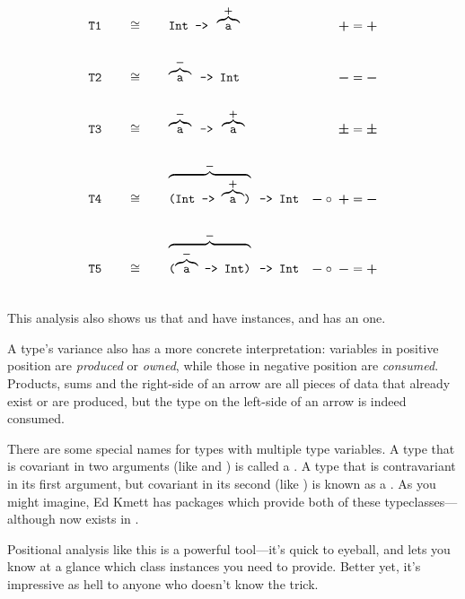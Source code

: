 \documentclass[book.tex]{subfiles}
\begin{document}
\begin{align*}
  \tyAnno{T1}{\ty{Int -> }\posp{\ty{a}}}{\possym}{\possym}
  \tyAnno{T2}{\negp{\ty{a}}\ty{ -> Int}}{\negsym}{\negsym}
  \tyAnno{T3}{\negp{\ty{a}}\ty{ -> }\posp{\ty{a}}}{\pmsym}{\pmsym}
  \tyAnno{T4}{\negp{\ty{(Int -> }\posp{\ty{a}}\ty{)}}\ty{ -> Int}}{\negsym\circ\;\possym}{\negsym}
  \tyAnno{T5}{\negp{\ty{(}\negp{\ty{a}}\ty{ -> Int)}}\ty{ -> Int}}{\negsym\circ\;\negsym}{\possym}
\end{align*}

This analysis also shows us that  and  have 
instances, and  has an  one.

A type's variance also has a more concrete interpretation: variables in positive
position are \emph{produced} or \emph{owned}, while those in negative position
are \emph{consumed}. Products, sums and the right-side of an arrow are all
pieces of data that already exist or are produced, but the type on the left-side
of an arrow is indeed consumed.

There are some special names for types with multiple type variables. A type that
is covariant in two arguments (like  and \ty{(,)}) is called a
. A type that is contravariant in its first argument, but
covariant in its second (like \ty{(->)}) is known as a . As you
might imagine, Ed Kmett has packages which provide both of these
typeclasses---although  now exists in .

Positional analysis like this is a powerful tool---it's quick to eyeball, and
lets you know at a glance which class instances you need to provide. Better yet,
it's impressive as hell to anyone who doesn't know the trick.
\end{document}
